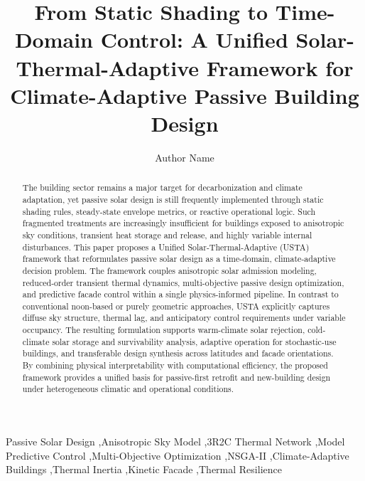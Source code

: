 \documentclass[preprint,12pt]{elsarticle}
\begin{document}
\begin{frontmatter}

\title{From Static Shading to Time-Domain Control: A Unified Solar-Thermal-Adaptive Framework for Climate-Adaptive Passive Building Design}

\author[inst1]{Author Name}

\begin{abstract}
The building sector remains a major target for decarbonization and climate adaptation, yet passive solar design is still frequently implemented through static shading rules, steady-state envelope metrics, or reactive operational logic. Such fragmented treatments are increasingly insufficient for buildings exposed to anisotropic sky conditions, transient heat storage and release, and highly variable internal disturbances. This paper proposes a Unified Solar-Thermal-Adaptive (USTA) framework that reformulates passive solar design as a time-domain, climate-adaptive decision problem. The framework couples anisotropic solar admission modeling, reduced-order transient thermal dynamics, multi-objective passive design optimization, and predictive facade control within a single physics-informed pipeline. In contrast to conventional noon-based or purely geometric approaches, USTA explicitly captures diffuse sky structure, thermal lag, and anticipatory control requirements under variable occupancy. The resulting formulation supports warm-climate solar rejection, cold-climate solar storage and survivability analysis, adaptive operation for stochastic-use buildings, and transferable design synthesis across latitudes and facade orientations. By combining physical interpretability with computational efficiency, the proposed framework provides a unified basis for passive-first retrofit and new-building design under heterogeneous climatic and operational conditions.
\end{abstract}

\begin{keyword}
Passive Solar Design \sep Anisotropic Sky Model \sep 3R2C Thermal Network \sep Model Predictive Control \sep Multi-Objective Optimization \sep NSGA-II \sep Climate-Adaptive Buildings \sep Thermal Inertia \sep Kinetic Facade \sep Thermal Resilience
\end{keyword}

\end{frontmatter}
\end{document}
